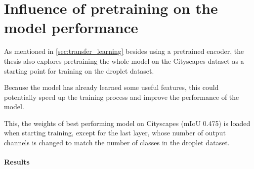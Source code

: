 \section{Influence of pretraining on the model performance}
\label{sec:pretraining}

As mentioned in \ref{sec:transfer_learning} besides using a pretrained encoder, the thesis also explores pretraining the whole model on the Cityscapes dataset as a starting point for training on the droplet dataset.

Because the model has already learned some useful features, this could potentially speed up the training process and improve the performance of the model. 

This, the weights of best performing model on Cityscapes (mIoU \num{0.475}) is loaded when starting training, except for the last layer, whose number of output channels is changed to match the number of classes in the droplet dataset.

\paragraph{Results}


